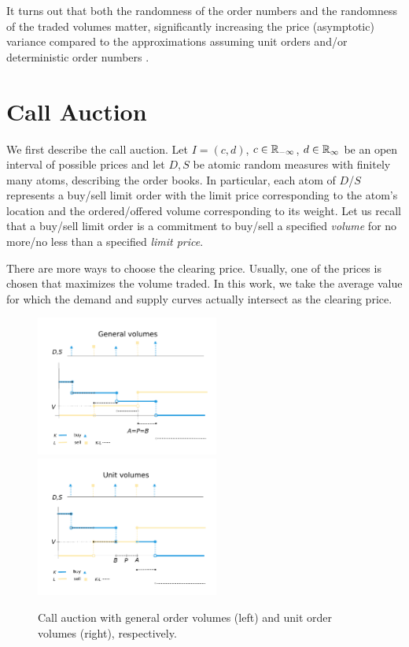 \documentclass{aptpub}
\begin{document}
It turns out that both the randomness of the order numbers and the randomness of the traded volumes matter, significantly increasing the price (asymptotic) variance compared to the approximations assuming unit orders \cite{mendelson1982market,toke2015exact,derksen2020clearing} and/or deterministic order numbers \cite{derksen2020clearing}.




\section{Call Auction}
\label{sec:call}

We first describe the call auction. Let $I=(c,d)$, $c\in\mathbb{R}_{-\infty}$, $d\in\mathbb{R}_{\infty}$ be an open
interval of possible prices and let $D,S$ be atomic random measures with finitely many atoms,
describing the order books. In particular, each atom of $D$/$S$ represents a buy/sell
limit order with the limit price corresponding to the atom's location and the ordered/offered volume corresponding to its weight.
Let us recall that a buy/sell limit order is a commitment to buy/sell a specified {\em volume} for no more/no less than a specified {\em limit price}.

There are more ways to choose the clearing price. Usually, one of the prices is chosen that maximizes the volume traded. In this work, we take the average value for which the demand and supply curves actually intersect as the clearing price.

\begin{figure}
\begin{center}
\includegraphics[width=6cm]{nuob.pdf}
\includegraphics[width=6cm]{ob.pdf}
\end{center}
\caption{Call auction with general order volumes (left) and unit order volumes (right), respectively.}
\label{fig:ob}
\end{figure}
\end{document}
